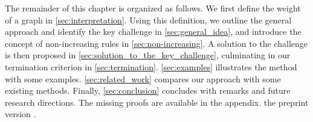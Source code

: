 The remainder of this chapter is organized as follows.
We first define the weight of a graph in \autoref{sec:interpretation}. 
Using this definition, we outline the general approach and identify the key challenge in \autoref{sec:general_idea}, and introduce the concept of non-increasing rules in \autoref{sec:non-increasing}. 
A solution to the challenge is then proposed in \autoref{sec:solution_to_the_key_challenge}, culminating in our termination criterion in \autoref{sec:termination}.
\autoref{sec:examples} illustrates the method with some examples.
\autoref{sec:related_work} compares our approach with some existing methods.
Finally, \autoref{sec:conclusion} concludes with remarks and future research directions. The missing proofs are available in 
\iflongversion
the appendix.
\else
the preprint version \cite{qiu2025termination}.
\fi